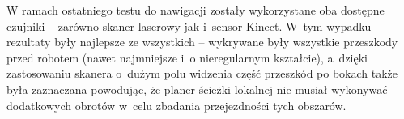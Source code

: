 W ramach ostatniego testu do nawigacji zostały wykorzystane oba dostępne czujniki 
-- zarówno skaner laserowy jak i~sensor Kinect. W~tym wypadku rezultaty były 
najlepsze ze wszystkich -- wykrywane były wszystkie przeszkody przed robotem
(nawet najmniejsze i~o nieregularnym kształcie), a~dzięki zastosowaniu skanera
o~dużym polu widzenia część przeszkód po bokach także była zaznaczana powodując,
że planer ścieżki lokalnej nie musiał wykonywać dodatkowych obrotów w~celu 
zbadania przejezdności tych obszarów.

